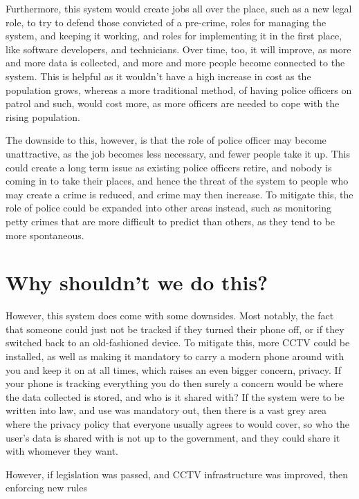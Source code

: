 \documentclass[12pt]{amsart}
\begin{document}
    Furthermore, this system would create jobs all over the place, such as a new legal role, to try to defend those
    convicted of a pre-crime, roles for managing the system, and keeping it working, and roles for implementing it in
    the first place, like software developers, and technicians.
    Over time, too, it will improve, as more and more data is collected, and more and more people become connected to
    the system.
    This is helpful as it wouldn't have a high increase in cost as the population grows, whereas a more traditional
    method, of having police officers on patrol and such, would cost more, as more officers are needed to cope with
    the rising population.

    The downside to this, however, is that the role of police officer may become unattractive, as the job becomes less
    necessary, and fewer people take it up.
    This could create a long term issue as existing police officers retire, and nobody is coming in to take
    their places, and hence the threat of the system to people who may create a crime is reduced, and crime may then
    increase.
    To mitigate this, the role of police could be expanded into other areas instead, such as monitoring petty crimes
    that are more difficult to predict than others, as they tend to be more spontaneous.

    \section{Why shouldn't we do this?}\label{sec:why-shouldn't-we-do-this?}

    However, this system does come with some downsides.
    Most notably, the fact that someone could just not be tracked if they turned their phone off, or if they switched
    back to an old-fashioned device.
    To mitigate this, more CCTV could be installed, as well as making it mandatory to carry a modern phone around with
    you and keep it on at all times, which raises an even bigger concern, privacy.
    If your phone is tracking everything you do then surely a concern would be where the data collected is stored, and
    who is it shared with?
    If the system were to be written into law, and use was mandatory out, then there is a vast grey area where the
    privacy policy that everyone usually agrees to would cover, so who the user's data is shared with is not up to the
    government, and they could share it with whomever they want.

    However, if legislation was passed, and CCTV infrastructure was improved, then enforcing new rules
\end{document}
